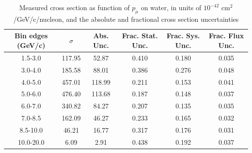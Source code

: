 \documentclass[../main.tex]{subfiles}
\begin{document}
\begin{table}
  \centering
  \renewcommand{\arraystretch}{1.15}
  \caption{Measured cross section as function of $p_{\mu}$ on water, in units of $10^{-42}$ $\text{cm}^2$/GeV/c/nucleon, and the absolute and fractional cross section uncertainties}
    \begin{tabular}{c||c|c||c|c|c}
      Bin edges (GeV/c) &  $\sigma$  &  Abs. Unc.  &  Frac. Stat. Unc.  &  Frac. Sys. Unc.  &  Frac. Flux Unc. \\
      \hline
      \hline
      1.5-3.0 & 117.95 & 52.87 & 0.410 & 0.180 & 0.035\\
      3.0-4.0 & 185.58 & 88.01 & 0.386 & 0.276 & 0.048\\
      4.0-5.0 & 457.01 & 118.99 & 0.211 & 0.153 & 0.041\\
      5.0-6.0 & 476.40 & 113.68 & 0.187 & 0.148 & 0.037\\
      6.0-7.0 & 340.82 & 84.27 & 0.207 & 0.135 & 0.035\\
      7.0-8.5 & 162.09 & 46.27 & 0.233 & 0.165 & 0.032\\
      8.5-10.0 & 46.21 & 16.77 & 0.317 & 0.176 & 0.031\\
      10.0-20.0 & 6.09 & 2.91 & 0.438 & 0.192 & 0.037
    \end{tabular}
  \label{tbl:datanucleonnuc10muon_pa}
\end{table}
\begin{table}
  \centering
  \renewcommand{\arraystretch}{1.15}
  \caption{Statistical covariance matrix of measured cross section as function of $p_{\mu}$ on water, in units of $10^{-84}$ $(\text{cm}^2$/GeV/c/nucleon$)^2$}
  \label{tbl:statnucleonnuc10muon_pb}
\end{table}
\end{document}
